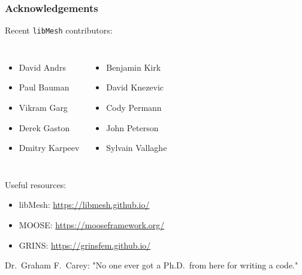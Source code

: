 \documentclass[mathserif]{beamer}
\newcommand{\software}[1]{{\texttt{#1}}}
\newcommand{\libMesh}{\software{libMesh}}
\begin{document}
\begin{frame}
\frametitle{Acknowledgements}

Recent \libMesh{} contributors:
\begin{columns}


\begin{itemize}
\item David Andrs
\item Paul Bauman
\item Vikram Garg
\item Derek Gaston
\item Dmitry Karpeev
\end{itemize}

\begin{itemize}
\item Benjamin Kirk
\item David Knezevic
\item Cody Permann
\item John Peterson
\item Sylvain Vallaghe
\end{itemize}

\end{columns}

\vspace{5mm}

Useful resources:
\begin{itemize}
\item libMesh: \url{https://libmesh.github.io/}
\item MOOSE: \url{https://mooseframework.org/}
\item GRINS: \url{https://grinsfem.github.io/}
\end{itemize}

\vspace{5mm}

Dr.\ Graham F.\ Carey: "No one ever got a Ph.D.\ from here for writing
a code."

\end{frame}
\end{document}

